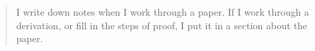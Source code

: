 \begin{framed}
\begin{quotation}
I write down notes when I work through a paper. If I work through a derivation, or fill in the steps of proof, I put it in a section about the paper. \cite{riboch}
\end{quotation}
\end{framed}